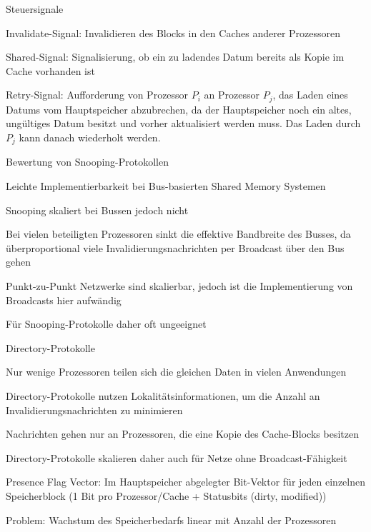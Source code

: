 \documentclass[10pt,landscape]{article}
\begin{document}
\begin{multicols}{3}
\begin{itemize*}
  \end{itemize*}
  Steuersignale
  \begin{itemize*}
    \item Invalidate-Signal: Invalidieren des Blocks in den Caches anderer Prozessoren
    \item Shared-Signal: Signalisierung, ob ein zu ladendes Datum bereits als Kopie im Cache vorhanden ist
    \item Retry-Signal: Aufforderung von Prozessor $P_i$ an Prozessor $P_j$, das Laden eines Datums vom Hauptspeicher abzubrechen, da der Hauptspeicher noch ein altes, ungültiges Datum besitzt und vorher aktualisiert werden muss. Das Laden durch $P_j$ kann danach wiederholt werden.
  \end{itemize*}
  Bewertung von Snooping-Protokollen
  \begin{itemize*}
    \item Leichte Implementierbarkeit bei Bus-basierten Shared Memory Systemen
    \item Snooping skaliert bei Bussen jedoch nicht
    \item Bei vielen beteiligten Prozessoren sinkt die effektive Bandbreite des Busses, da überproportional viele Invalidierungsnachrichten per Broadcast über den Bus gehen
    \item Punkt-zu-Punkt Netzwerke sind skalierbar, jedoch ist die Implementierung von Broadcasts hier aufwändig
    \item Für Snooping-Protokolle daher oft ungeeignet
  \end{itemize*}
  
  Directory-Protokolle
  \begin{itemize*}
    \item Nur wenige Prozessoren teilen sich die gleichen Daten in vielen Anwendungen
    \item Directory-Protokolle nutzen Lokalitätsinformationen, um die Anzahl an Invalidierungsnachrichten zu minimieren
    \item Nachrichten gehen nur an Prozessoren, die eine Kopie des Cache-Blocks besitzen
    \item Directory-Protokolle skalieren daher auch für Netze ohne Broadcast-Fähigkeit
    \item Presence Flag Vector: Im Hauptspeicher abgelegter Bit-Vektor für jeden einzelnen Speicherblock (1 Bit pro Prozessor/Cache + Statusbits (dirty, modified))
    \item Problem: Wachstum des Speicherbedarfs linear mit Anzahl der Prozessoren
  \end{itemize*}
    
\end{multicols}
\end{document}
